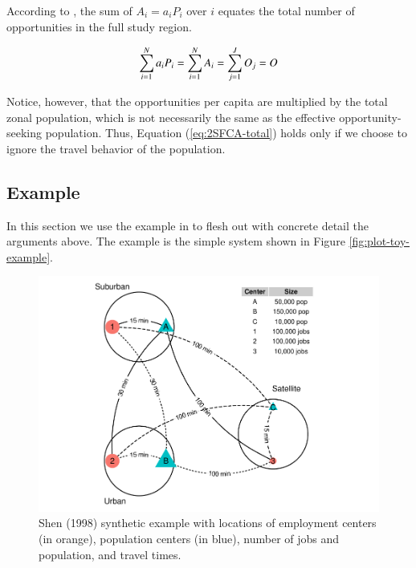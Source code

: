 \documentclass[]{elsarticle} %
\begin{document}
According to \citet{shen1998}, the sum of \(A_i = a_i P_i\) over \(i\)
equates the total number of opportunities in the full study region.

\begin{equation}
\label{eq:2SFCA-total}
\sum_{i=1}^N a_{i} P_i = \sum_{i=1}^N A_i = \sum_{j=1}^JO_j=O\\
\end{equation}

Notice, however, that the opportunities per capita are multiplied by the
total zonal population, which is not necessarily the same as the
effective opportunity-seeking population. Thus, Equation
(\ref{eq:2SFCA-total}) holds only if we choose to ignore the travel
behavior of the population.

\hypertarget{example}{%
\subsection{Example}\label{example}}

In this section we use the example in \citet{shen1998} to flesh out with
concrete detail the arguments above. The example is the simple system
shown in Figure \ref{fig:plot-toy-example}.

\begin{figure}

{\centering \includegraphics[width=1\linewidth]{Spatial-Availability-Refreshed_files/figure-latex/create-figure-with-toy-example-1} 

}

\caption{\label{fig:plot-toy-example} Shen (1998) synthetic example with locations of employment centers (in orange), population centers (in blue), number of jobs and population, and travel times.}\label{fig:create-figure-with-toy-example}
\end{figure}
\end{document}
